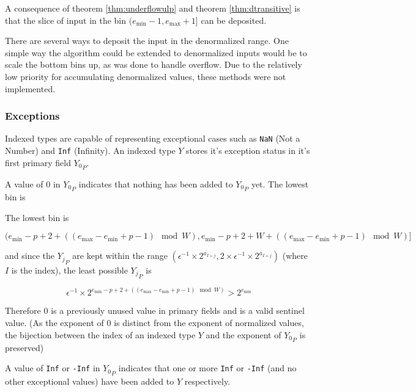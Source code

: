 \documentclass[12pt]{article}
\providecommand{\min}{\ensuremath{\text{min}}}
\providecommand{\max}{\ensuremath{\text{max}}}
\theoremstyle{plain}
\numberwithin{equation}{section}
\begin{document}
      A consequence of theorem \ref{thm:underflowulp} and theorem \ref{thm:dtransitive} is that the slice of input in the bin $(e_{\min} - 1, e_{\max} + 1]$ can be deposited.

      There are several ways to deposit the input in the denormalized range. One simple way the algorithm could be extended to denormalized inputs would be to scale the bottom bins up, as was done to handle overflow. Due to the relatively low priority for accumulating denormalized values, these methods were not implemented.

    \subsubsection{Exceptions}
      \label{sec:indexed_implementation_exceptions}
      Indexed types are capable of representing exceptional cases such as \verb|NaN| (Not a Number) and \verb|Inf| (Infinity). An indexed type $Y$ stores it's exception status in it's first primary field ${Y_0}_P$.

      A value of $0$ in ${Y_0}_P$ indicates that nothing has been added to ${Y_0}_P$ yet. The lowest bin is

      The lowest bin is

      \begin{equation*}
      (e_{\min} - p + 2 + ((e_{\max} - e_{\min} + p - 1 ) \mod W), e_{\min} - p + 2 + W + ((e_{\max} - e_{\min} + p - 1)\mod W)]
      \end{equation*}

      and since the ${Y_j}_P$ are kept within the range $(\epsilon^{-1} \times 2^{a_{I + j}}, 2 \times \epsilon^{-1} \times 2^{a_{I + j}})$ (where $I$ is the index), the least possible ${Y_j}_P$ is

      \begin{equation*}
      \epsilon^{-1} \times 2^{e_{\min} - p + 2 + ((e_{\max} - e_{\min} + p - 1)\mod W)} > 2^{e_{\min}}
      \end{equation*}

      Therefore $0$ is a previously unused value in primary fields and is a valid sentinel value. (As the exponent of $0$ is distinct from the exponent of normalized values, the bijection between the index of an indexed type $Y$ and the exponent of ${Y_0}_P$ is preserved)

      A value of \verb|Inf| or \verb|-Inf| in ${Y_0}_P$ indicates that one or more \verb|Inf| or \verb|-Inf| (and no other exceptional values) have been added to $Y$ respectively.
\end{document}
